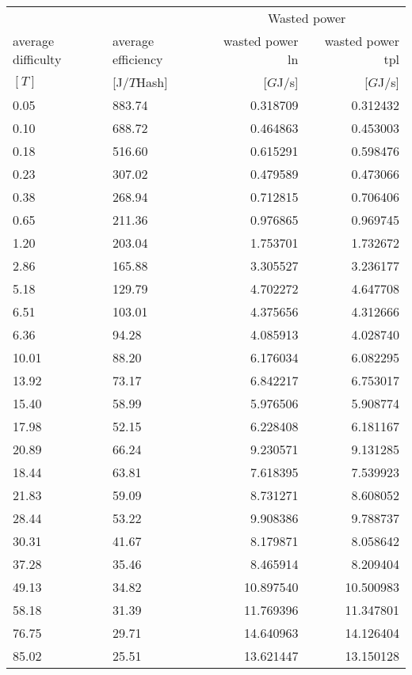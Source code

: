 \begin{tabular}{@{}llrr@{}}
\toprule
 &  & \multicolumn{2}{c}{Wasted power} \\
\cmidrule(lr){3-4} 
average difficulty & average efficiency & wasted power ln & wasted power tpl\\
$[T]$ & [J/$T$Hash] & [$G$J/s] & [$G$J/s]\\
\cmidrule(lr){1-4}
0.05 & 883.74 & 0.318709 & 0.312432 \\
0.10 & 688.72 & 0.464863 & 0.453003 \\
0.18 & 516.60 & 0.615291 & 0.598476 \\
0.23 & 307.02 & 0.479589 & 0.473066 \\
0.38 & 268.94 & 0.712815 & 0.706406 \\
0.65 & 211.36 & 0.976865 & 0.969745 \\
1.20 & 203.04 & 1.753701 & 1.732672 \\
2.86 & 165.88 & 3.305527 & 3.236177 \\
5.18 & 129.79 & 4.702272 & 4.647708 \\
6.51 & 103.01 & 4.375656 & 4.312666 \\
6.36 & 94.28 & 4.085913 & 4.028740 \\
10.01 & 88.20 & 6.176034 & 6.082295 \\
13.92 & 73.17 & 6.842217 & 6.753017 \\
15.40 & 58.99 & 5.976506 & 5.908774 \\
17.98 & 52.15 & 6.228408 & 6.181167 \\
20.89 & 66.24 & 9.230571 & 9.131285 \\
18.44 & 63.81 & 7.618395 & 7.539923 \\
21.83 & 59.09 & 8.731271 & 8.608052 \\
28.44 & 53.22 & 9.908386 & 9.788737 \\
30.31 & 41.67 & 8.179871 & 8.058642 \\
37.28 & 35.46 & 8.465914 & 8.209404 \\
49.13 & 34.82 & 10.897540 & 10.500983 \\
58.18 & 31.39 & 11.769396 & 11.347801 \\
76.75 & 29.71 & 14.640963 & 14.126404 \\
85.02 & 25.51 & 13.621447 & 13.150128 \\
\bottomrule
\end{tabular}
